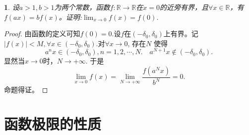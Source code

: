 \documentclass[utf8]{book}
\newtheorem{example}{}[section]             %
\begin{document}
\begin{example}
设$a>1,b>1$为两个常数，函数$f:\mathbb{R}\rightarrow \mathbb{R}$在$x=0$的近旁有界，且$\forall x\in\mathbb{R}$，有$f(ax)=bf(x)$。证明:$\displaystyle\lim_{x\to 0}f(x)=f(0)$.
\end{example}
\begin{proof}
由函数的定义可知$f(0) = 0$.设$f$在$(-\delta_0, \delta_0)$上有界。记$|f(x)| < M, \forall x\in (-\delta_0, \delta_0)$.对$\forall x \to 0$, 存在$N$
使得$$a^nx\in (-\delta_0, \delta_0), n=1,2,\cdots, N. \quad a^{N+1}x\notin (-\delta_0, \delta_0).$$
显然当$x\to 0$时，$N\to +\infty$.
于是
$$\displaystyle\lim_{x\to 0}f(x) = \displaystyle\lim_{N\to +\infty}\frac{f(a^Nx)}{b^{N}} = 0.$$
命题得证。
\end{proof}
\section{函数极限的性质}
\end{document}
